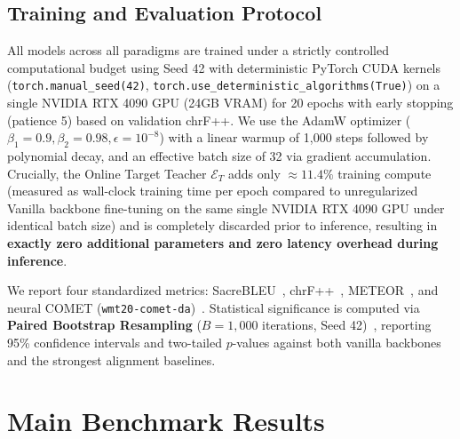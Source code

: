 \documentclass[11pt]{article}
\begin{document}
\subsection{Training and Evaluation Protocol}
All models across all paradigms are trained under a strictly controlled computational budget using Seed 42 with deterministic PyTorch CUDA kernels (\texttt{torch.manual\_seed(42)}, \texttt{torch.use\_deterministic\_algorithms(True)}) on a single NVIDIA RTX 4090 GPU (24GB VRAM) for 20 epochs with early stopping (patience 5) based on validation chrF++. We use the AdamW optimizer ($\beta_1=0.9, \beta_2=0.98, \epsilon=10^{-8}$) with a linear warmup of 1,000 steps followed by polynomial decay, and an effective batch size of 32 via gradient accumulation. Crucially, the Online Target Teacher $\mathcal{E}_T$ adds only $\approx 11.4\%$ training compute (measured as wall-clock training time per epoch compared to unregularized Vanilla backbone fine-tuning on the same single NVIDIA RTX 4090 GPU under identical batch size) and is completely discarded prior to inference, resulting in \textbf{exactly zero additional parameters and zero latency overhead during inference}.

We report four standardized metrics: SacreBLEU~\cite{post2018call}, chrF++~\cite{popovic2015chrf}, METEOR~\cite{banerjee2005meteor}, and neural COMET (\texttt{wmt20-comet-da})~\cite{rei2020comet}. Statistical significance is computed via \textbf{Paired Bootstrap Resampling} ($B=1,000$ iterations, Seed 42)~\cite{koehn2004statistical}, reporting 95\% confidence intervals and two-tailed $p$-values against both vanilla backbones and the strongest alignment baselines.

\section{Main Benchmark Results}
\label{sec:results}
\end{document}
